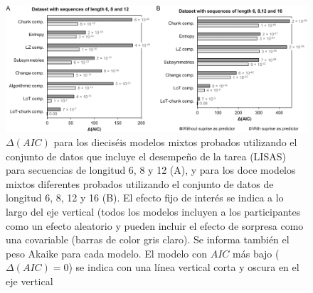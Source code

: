 \begin{figure}[t!]
   \includegraphics[scale=0.8]{figuras/plosbio/journal.pcbi.1008598.g008.PNG}
   
   \centering
   
   \caption{$\Delta(AIC)$ para los dieciséis modelos mixtos probados utilizando el conjunto de datos que incluye el desempeño de la tarea (LISAS) para secuencias de longitud 6, 8 y 12 (A), y para los doce modelos mixtos diferentes probados utilizando el conjunto de datos de longitud 6, 8, 12 y 16 (B). El efecto fijo de interés se indica a lo largo del eje vertical (todos los modelos incluyen a los participantes como un efecto aleatorio y pueden incluir el efecto de sorpresa como una covariable (barras de color gris claro). Se informa también el peso Akaike para cada modelo. El modelo con $AIC$ más bajo ($\Delta (AIC) = 0$) se indica con una línea vertical corta y oscura en el eje vertical}
   \label{PlosBIO-F8}
\end{figure}


